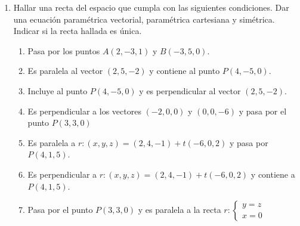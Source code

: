 \documentclass[a4paper]{article}
\newcommand{\exercise}{\item}
\begin{document}
\begin{enumerate}
\begin{enumerate} [label=(\alph*)]
		\item Calcular la distancia entre las rectas $r: (x,y)=t(4,4)+(2,-5)$ y $s: (x,y)=k(1,1)+(0,-9)$

		\item Calcular la proyección ortogonal del punto $P(3,-1)$ sobre la recta $r: -x-y-12=0$.

		\item Calcular la proyección ortogonal del punto $P(-2,2)$ sobre la recta $r: -5x+y-1=0$ y el punto simétrico $P'$.

		\item Hallar el valor de $a\in\mathbb{R}$ para que el ángulo entre $r_1: ax+3y=0$ ~y~ $r_2:\left\{\begin{matrix} x=4+\lambda \\ 1-2\lambda \end{matrix}\right.$ sea de $30^{\circ}$. 

	\end{enumerate}

	\exercise Hallar una recta del espacio que cumpla con las siguientes condiciones. Dar una ecuación paramétrica vectorial, paramétrica cartesiana y simétrica. Indicar si la recta hallada es única.
	\begin{enumerate} [label=(\alph*)]
		\item Pasa por los puntos $A(2,-3,1)$ y $B(-3,5,0)$.

		\item Es paralela al vector $(2,5,-2)$ y contiene al punto $P(4,-5,0)$.

		\item Incluye al punto $P(4,-5,0)$ y es perpendicular al vector $(2,5,-2)$.

		\item Es perpendicular a los vectores $(-2,0,0)$ y $(0,0,-6)$ y pasa por el punto $P(3,3,0)$

		\item Es paralela a $r: (x,y,z)=(2,4,-1)+t(-6,0,2)$ y pasa por $P(4,1,5)$.

		\item Es perpendicular a $r: (x,y,z)=(2,4,-1)+t(-6,0,2)$ y contiene a $P(4,1,5)$.

		\item Pasa por el punto $P(3,3,0)$ y es paralela a la recta $r: \left\{\begin{matrix}y=z\\x=0\end{matrix}\right.$


\end{enumerate}
\end{enumerate}
\end{document}
